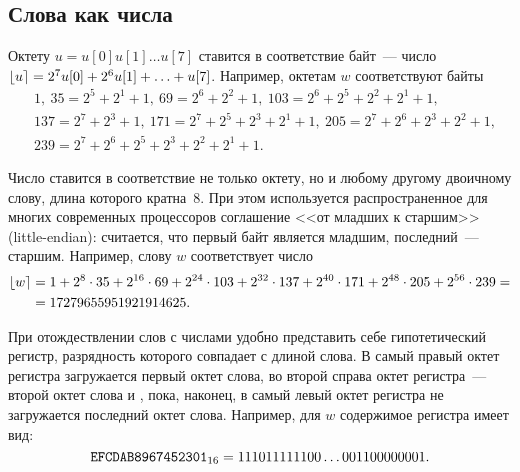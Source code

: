 \subsection{Слова как числа}

Октету $u=u[0]u[1]\ldots u[7]$ ставится в соответствие байт~--- 
число $\lfloor u\rceil=2^7u[0]+2^6 u[1]+\ldots + u[7]$. 
Например, октетам $w$ соответствуют байты
\begin{align*}
&
1,\ 
35=2^5+2^1+1,\ 
69=2^6+2^2+1,\ 
103=2^6+2^5+2^2+2^1+1,\\
%
&
137=2^7+2^3+1,\ 
171=2^7+2^5+2^3+2^1+1,\
205=2^7+2^6+2^3+2^2+1,\\
&
239=2^7+2^6+2^5+2^3+2^2+2^1+1.
\end{align*}

Число ставится в соответствие не только октету, но и любому другому
двоичному слову, длина которого кратна~$8$. 
%
При этом используется распространенное для многих современных 
процессоров соглашение <<от младших к старшим>> (little-endian):
считается, что первый байт является младшим, последний~--- старшим.
Например, слову $w$ соответствует число
\begin{align*}
\lfloor w\rceil&=
1 + 2^{8}\cdot 35 + 2^{16}\cdot 69 + 2^{24}\cdot 103 + 
2^{32}\cdot 137 + 2^{40}\cdot 171 + 2^{48}\cdot 205 + 2^{56}\cdot 239 =\\
& = 17279655951921914625.
\end{align*}

При отождествлении слов с числами удобно представить себе 
гипотетический регистр, разрядность которого совпадает с длиной слова.
В самый правый октет регистра загружается первый октет слова, 
во второй справа октет регистра~--- второй октет слова и ,
пока, наконец, в самый левый октет регистра не загружается последний 
октет слова.
%
Например, для $w$ содержимое регистра имеет 
вид:
$$
\hex{EFCDAB8967452301}
=
%
11101111 1100 \ldots 0011 00000001.
$$

